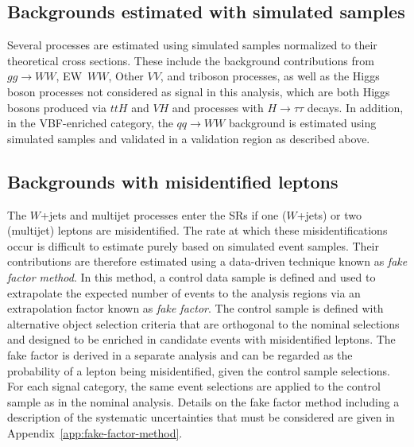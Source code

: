 \subsection{Backgrounds estimated with simulated samples}
Several processes are estimated using simulated samples normalized to their theoretical cross sections.
These include the background contributions from $gg \to WW$, EW~$WW$, Other $VV$, and triboson processes, as well as the Higgs boson processes not considered as signal in this analysis, which are both Higgs bosons produced via $ttH$ and $VH$ and processes with $H\to\tau\tau$ decays. In addition, in the VBF-enriched \TwoJet category, the $qq \to WW$ background is estimated using simulated samples and validated in a validation region as described above.

\subsection{Backgrounds with misidentified leptons}
\label{subsec:misid-bkg}
The $W$+jets and multijet processes enter the SRs if one ($W$+jets) or two (multijet) leptons are misidentified.
The rate at which these misidentifications occur is difficult to estimate purely based on simulated event samples.
Their contributions are therefore estimated using a data-driven technique known as \emph{fake factor method}. In this method, a control data sample is defined and used to extrapolate the expected number of events to the analysis regions via an extrapolation factor known as \emph{fake factor}.
The control sample is defined with alternative object selection criteria that are orthogonal to the nominal selections and designed to be enriched in candidate events with misidentified leptons.
The fake factor is derived in a separate analysis and can be regarded as the probability of a lepton being misidentified, given the control sample selections.
For each signal category, the same event selections are applied to the control sample as in the nominal analysis. Details on the fake factor method including a description of the systematic uncertainties that must be considered are given in Appendix~\ref{app:fake-factor-method}.



